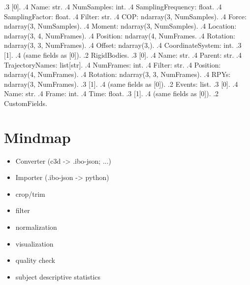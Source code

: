 \documentclass{article}
\begin{document}
{.3 [0].
.4 Name: str.
.4 NumSamples: int.
.4 SamplingFrequency: float.
.4 SamplingFactor: float.
.4 Filter: str.
.4 COP: ndarray(3, NumSamples).
.4 Force: ndarray(3, NumSamples).
.4 Moment: ndarray(3, NumSamples).
.4 Location: ndarray(3, 4, NumFrames).
.4 Position: ndarray(4, NumFrames.
.4 Rotation: ndarray(3, 3, NumFrames).
.4 Offset: ndarray(3,).
.4 CoordinateSystem: int.
.3 [1].
.4 (same fields as [0]).
.2 RigidBodies.
.3 [0].
.4 Name: str.
.4 Parent: str.
.4 TrajectoryNames: list[str].
.4 NumFrames: int.
.4 Filter: str.
.4 Position: ndarray(4, NumFrames).
.4 Rotation: ndarray(3, 3, NumFrames).
.4 RPYs: ndarray(3, NumFrames).
.3 [1].
.4 (same fields as [0]).
.2 Events: list.
.3 [0].
.4 Name: str.
.4 Frame: int.
.4 Time: float.
.3 [1].
.4 (same fields as [0]).
.2 CustomFields.
}


\section{Mindmap}
\begin{itemize}
    \item Converter (c3d -> .ibo-json; ...)
    \item Importer (.ibo-json -> python)
    \item crop/trim
    \item filter
    \item normalization
    \item visualization
    \item quality check
    \item subject descriptive statistics
    
    
\end{itemize}
\end{document}
